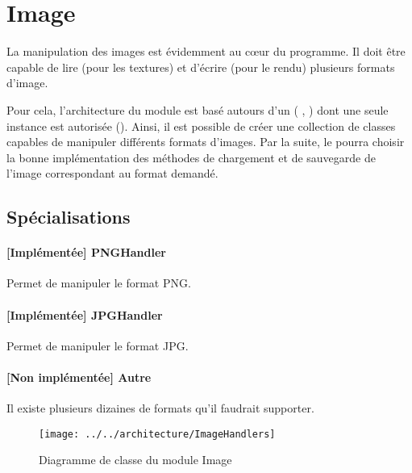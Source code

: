 \section{Image}
La manipulation des images est évidemment au cœur du programme. Il doit être
capable de lire (pour les textures) et d'écrire (pour le rendu) plusieurs
formats d'image.

Pour cela, l'architecture du module est basé autours d'un  (\cf
\cite{DesignPatternsBook}, ) dont une seule instance est autorisée
(). Ainsi, il est possible de créer une
collection de classes capables de manipuler différents formats d'images. Par la
suite, le  pourra choisir la bonne implémentation des méthodes de
chargement et de sauvegarde de l'image correspondant au format demandé.

\subsection{Spécialisations}
\paragraph{[Implémentée] PNGHandler} Permet de manipuler le format PNG.

\paragraph{[Implémentée] JPGHandler} Permet de manipuler le format JPG. 

\paragraph{[Non implémentée] Autre} Il existe plusieurs dizaines de formats
qu'il faudrait supporter.

\begin{figure}[h]
\begin{center}
  \texttt{[image: ../../architecture/ImageHandlers]}
  \caption{Diagramme de classe du module Image\label{fig:CDImageHandlers}}
\end{center}
\end{figure}
